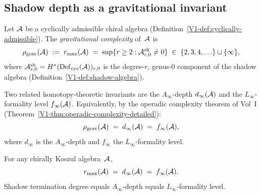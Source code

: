 
\subsection{Shadow depth as a gravitational invariant}

\begin{definition}
Let $\mathcal{A}$ be a cyclically admissible chiral algebra
(Definition~\ref{V1-def:cyclically-admissible}).
The \emph{gravitational complexity} of~$\mathcal{A}$ is
\begin{equation}%
\rho_{\mathrm{grav}}(\cA)
\;:=\;
r_{\max}(\cA)
\;=\;
\sup\{r \geq 2 : \cA^{\mathrm{sh}}_{r,0} \neq 0\}
\;\in\;
\{2, 3, 4, \ldots\} \cup \{\infty\},
\end{equation}
where $\mathcal{A}^{\mathrm{sh}}_{r,0} =
H^*(\mathrm{Def}_{\mathrm{cyc}}(\mathcal{A}))_{r,0}$ is the degree-$r$, genus-$0$
component of the shadow algebra
(Definition~\ref{V1-def:shadow-algebra}).

Two related homotopy-theoretic invariants are the $A_\infty$-depth
$d_\infty(\mathcal{A})$ and the $L_\infty$-formality level $f_\infty(\mathcal{A})$.
Equivalently, by the operadic complexity theorem of Vol~I
\textup{(}Theorem~\textup{\ref*{V1-thm:operadic-complexity-detailed}}\textup{)}:
\begin{equation}%
\rho_{\mathrm{grav}}(\cA)
\;=\;
d_\infty(\cA)
\;=\;
f_\infty(\cA),
\end{equation}
where $d_\infty$ is the $A_\infty$-depth and $f_\infty$
the $L_\infty$-formality level.
\end{definition}

\begin{theorem}
\label{thm:operadic-complexity}
\ClaimStatusProvedHere
{}%
%
For any chirally Koszul algebra~$\mathcal{A}$,
\begin{equation}\label{eq:operadic-complexity-id}
r_{\max}(\mathcal{A}) \;=\; d_\infty(\mathcal{A}) \;=\; f_\infty(\mathcal{A}).
\end{equation}
Shadow termination degree equals $A_\infty$-depth equals
$L_\infty$-formality level.
\end{theorem}


